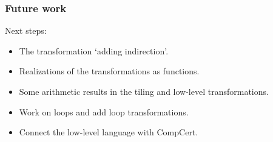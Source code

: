 \begin{frame}[fragile]
\frametitle{Future work}

Next steps:
\\[0.7em]
\begin{itemize}
	\setlength\itemsep{1.5em}
	\item The transformation `adding indirection'.
	\item Realizations of the transformations as functions.
	\item Some arithmetic results in the tiling and low-level transformations.
	\item Work on loops and add loop transformations.
	\item Connect the low-level language with CompCert.
\end{itemize}

\end{frame}


\frame{\titlepage}



